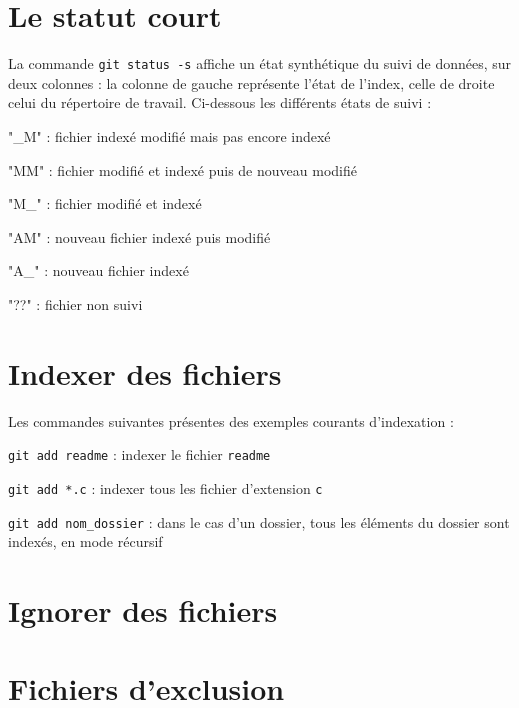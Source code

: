 \documentclass[11pt,twoside,headings=normal,open=right,french,DIV=12]{scrreprt}
\newcommand{\spec}[1]{\texttt{#1}}
\begin{document}
\section{Le statut court}



    La commande \verb|git status -s| affiche un état synthétique du suivi de données, sur deux colonnes : la colonne
    de gauche représente l'état de l'index, celle de droite celui du répertoire de travail. Ci-dessous les différents états de suivi :
    \begin{description}
	    \item {"\_M"} : fichier indexé modifié mais pas encore indexé
        \item {"MM"} : fichier modifié et indexé puis de nouveau modifié
		\item {"M\_"} : fichier modifié et indexé
		\item {"AM"} : nouveau fichier indexé puis modifié        
		\item {"A\_"} : nouveau fichier indexé
	    \item {"??"} : fichier non suivi
	\end{description}    



\section{Indexer des fichiers}



    Les commandes suivantes présentes des exemples courants d'indexation :
    \begin{description}
        \item {\verb|git add readme|} : indexer le fichier \spec{readme}
        \item {\verb|git add *.c|} : indexer tous les fichier d'extension \spec{c}
        \item {\verb|git add nom_dossier|} : dans le cas d'un dossier, tous les éléments du dossier sont indexés, en mode récursif
    \end{description}



\section{Ignorer des fichiers}



\section{Fichiers d'exclusion}
\end{document}
